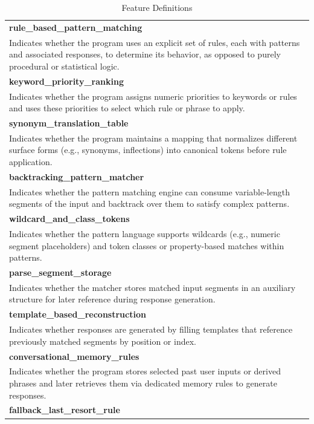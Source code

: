 \documentclass{article}
\begin{document}
\begin{table}[htbp]
\centering
\caption{Feature Definitions}
\label{tab:feature_definitions}
\begin{tabular}{|p{}|}
\hline
\textbf{rule\_based\_pattern\_matching} \\
Indicates whether the program uses an explicit set of rules, each with patterns and associated responses, to determine its behavior, as opposed to purely procedural or statistical logic. \\
\hline\hline
\textbf{keyword\_priority\_ranking} \\
Indicates whether the program assigns numeric priorities to keywords or rules and uses these priorities to select which rule or phrase to apply. \\
\hline\hline
\textbf{synonym\_translation\_table} \\
Indicates whether the program maintains a mapping that normalizes different surface forms (e.g., synonyms, inflections) into canonical tokens before rule application. \\
\hline\hline
\textbf{backtracking\_pattern\_matcher} \\
Indicates whether the pattern matching engine can consume variable-length segments of the input and backtrack over them to satisfy complex patterns. \\
\hline\hline
\textbf{wildcard\_and\_class\_tokens} \\
Indicates whether the pattern language supports wildcards (e.g., numeric segment placeholders) and token classes or property-based matches within patterns. \\
\hline\hline
\textbf{parse\_segment\_storage} \\
Indicates whether the matcher stores matched input segments in an auxiliary structure for later reference during response generation. \\
\hline\hline
\textbf{template\_based\_reconstruction} \\
Indicates whether responses are generated by filling templates that reference previously matched segments by position or index. \\
\hline\hline
\textbf{conversational\_memory\_rules} \\
Indicates whether the program stores selected past user inputs or derived phrases and later retrieves them via dedicated memory rules to generate responses. \\
\hline\hline
\textbf{fallback\_last\_resort\_rule} \\

\end{tabular}
\end{table}
\end{document}
